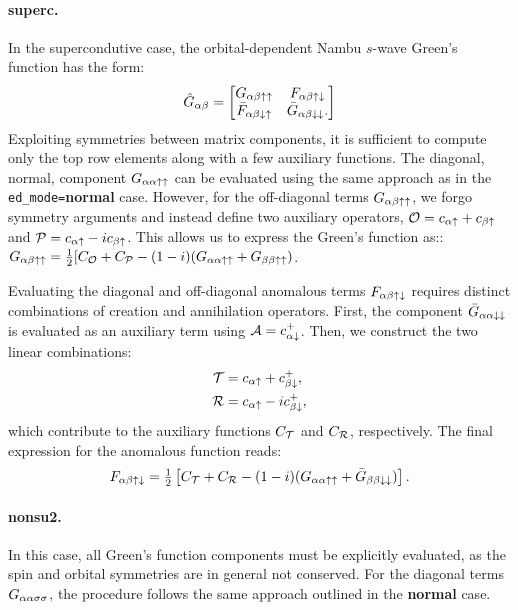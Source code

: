 \documentclass[edipack_sp.tex]{subfiles}
\begin{document}
\paragraph{{\bf superc}.}
In the supercondutive case, the orbital-dependent Nambu $s$-wave
Green's function has the form:
\begin{equation}
  \label{GFnambu}
  \hat{G}_{\alpha\beta} =
  \begin{bmatrix}
    G_{\alpha\beta\uparrow\uparrow} & F_{\alpha\beta\uparrow\downarrow} \\
    \bar{F}_{\alpha\beta\downarrow\uparrow} & \bar{G}_{\alpha\beta\downarrow\downarrow}.
  \end{bmatrix}  
\end{equation}
Exploiting symmetries between matrix components, it is 
sufficient to compute only the top row elements along with 
a few auxiliary functions\cite{Capone2001PRL,Capone2002Science,Capone2004sc,Toschi2005NJP,Toschi2005PRB,Capone2009RMP}.
%
The diagonal, normal, component $G_{\alpha\alpha\uparrow\uparrow}$ can be 
evaluated using the same approach as in the {\tt ed\_mode=}{\bf normal} 
case. However, for the off-diagonal terms $G_{\alpha\beta\uparrow\uparrow}$, 
we forgo symmetry arguments and instead define two 
auxiliary operators, ${\cal O} = c_{\alpha\uparrow} + c_{\beta\uparrow}$ and 
${\cal P} = c_{\alpha\uparrow} - i c_{\beta\uparrow}$. This allows us to express 
the Green's function as::
$G_{\alpha\beta\uparrow\uparrow}=\tfrac{1}{2}[C_{\cal O} + C_{\cal P} -
(1-i)(G_{\alpha\alpha\uparrow\uparrow}+G_{\beta\beta\uparrow\uparrow})$.

Evaluating the diagonal and off-diagonal anomalous terms 
$F_{\alpha\beta\uparrow\downarrow}$ requires distinct combinations of 
creation and annihilation operators\cite{Capone2001PRL,Capone2002Science,Capone2004sc,Toschi2005NJP,Toschi2005PRB}. First, the component 
$\bar{G}_{\alpha\alpha\downarrow\downarrow}$ is evaluated as an auxiliary term 
using ${\cal A} = c^+_{\alpha\downarrow}$. Then, we construct the two  
linear combinations:
\begin{align*}
{\cal T} &= c_{\alpha\uparrow} + c^+_{\beta\downarrow}, \\
{\cal R} &= c_{\alpha\uparrow} - i c^+_{\beta\downarrow},
\end{align*}
which contribute to the auxiliary functions $C_{\cal T}$ and 
$C_{\cal R}$, respectively. The final expression for the 
anomalous function reads:
\begin{equation}
F_{\alpha\beta\uparrow\downarrow} = \tfrac{1}{2} \left[ C_{\cal T} + C_{\cal R} - 
(1-i)(G_{\alpha\alpha\uparrow\uparrow} + \bar{G}_{\beta\beta\downarrow\downarrow}) \right].
\end{equation}



\paragraph{{\bf nonsu2}.}
In this case, all Green's function components 
must be explicitly evaluated, as the spin and orbital 
symmetries are in general not conserved. For the diagonal terms 
$G_{\alpha\alpha\sigma\sigma}$, the procedure follows the same approach 
outlined in the {\bf normal} case. 
\end{document}
